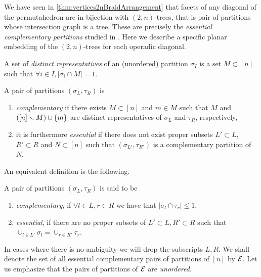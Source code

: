 We have seen in \cref{thm:vertices2nBraidArrangement} that facets of any diagonal of the permutahedron are in bijection with $(2,n)$-trees, that is pair of partitions whose intersection graph is a tree.
These are precisely the \emph{essential complementary partitions} studied in \cite{chen1969computer,chen1971tables,kajitani1982number}. 
Here we describe a specific planar embedding of the $(2,n)$-trees for each operadic diagonal. 

\begin{definition}
A set of \emph{distinct representatives} of an (unordered) partition $\sigma_I$ is a set $M\subset [n]$ such that $\forall i \in I,|\sigma_i \cap M| = 1$.
\end{definition}

\begin{definition}
A pair of partitions $(\sigma_L,\tau_R)$ is 
\begin{enumerate} 
    \item \emph{complementary} if there exists $M\subset [n]$ and $m \in M$ such that $M$ and $([n]\smallsetminus M) \cup \{m\}$ are distinct representatives of $\sigma_L$ and $\tau_R$, respectively,
    \item it is furthermore \emph{essential} if there does not exist proper subsets $ L'\subset L$, $R'\subset R$ and $N \subset [n]$ such that $(\sigma_{L'},\tau_{R'})$ is a complementary partition of $N$.
\end{enumerate}
\end{definition}

An equivalent definition is the following. 

\begin{definition}
A pair of partitions $(\sigma_L,\tau_R)$ is said to be 
\begin{enumerate}
	\item \emph{complementary}, if $\forall l\in L, r\in R$ we have that $|\sigma_l \cap \tau_r| \leq 1$,
	\item \emph{essential}, if there are no proper subsets of $L'\subset L,R'\subset R$ such that $\cup_{l \in L'} \sigma_l = \cup_{r \in R'} \tau_r$.
\end{enumerate}	
\end{definition}

In cases where there is no ambiguity we will drop the subscripts $L,R$.
We shall denote the set of all essential complementary pairs of partitions of $[n]$ by $\mathcal{E}$.
Let us emphasize that the pairs of partitions of $\mathcal{E}$ are \emph{unordered}.

